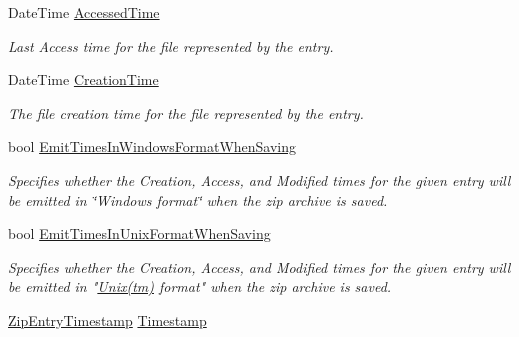 \begin{DoxyCompactItemize}
Date\+Time \mbox{\hyperlink{class_super_tiled2_unity_1_1_ionic_1_1_zip_1_1_zip_entry_abc1a038c251f1ed0e2c1435a5bab23fd}{Accessed\+Time}}
\begin{DoxyCompactList}\small\item\em Last Access time for the file represented by the entry. \end{DoxyCompactList}\item 
Date\+Time \mbox{\hyperlink{class_super_tiled2_unity_1_1_ionic_1_1_zip_1_1_zip_entry_a38ef2ae810c3b89b1f23ebea918fb60e}{Creation\+Time}}
\begin{DoxyCompactList}\small\item\em The file creation time for the file represented by the entry. \end{DoxyCompactList}\item 
bool \mbox{\hyperlink{class_super_tiled2_unity_1_1_ionic_1_1_zip_1_1_zip_entry_affabc22ba72be27e9134676becddcec7}{Emit\+Times\+In\+Windows\+Format\+When\+Saving}}
\begin{DoxyCompactList}\small\item\em Specifies whether the Creation, Access, and Modified times for the given entry will be emitted in \char`\"{}\+Windows format\char`\"{} when the zip archive is saved. \end{DoxyCompactList}\item 
bool \mbox{\hyperlink{class_super_tiled2_unity_1_1_ionic_1_1_zip_1_1_zip_entry_afd50bda347e67681780f32ebdba43f58}{Emit\+Times\+In\+Unix\+Format\+When\+Saving}}
\begin{DoxyCompactList}\small\item\em Specifies whether the Creation, Access, and Modified times for the given entry will be emitted in "\mbox{\hyperlink{namespace_super_tiled2_unity_1_1_ionic_1_1_zip_afa5034d6b4915c0633b590a28622f7fda6ec1bd1ea6a5d67a63b20c8f6172bddd}{Unix(tm)}} format" when the zip archive is saved. \end{DoxyCompactList}\item 
\mbox{\hyperlink{namespace_super_tiled2_unity_1_1_ionic_1_1_zip_afa5034d6b4915c0633b590a28622f7fd}{Zip\+Entry\+Timestamp}} \mbox{\hyperlink{class_super_tiled2_unity_1_1_ionic_1_1_zip_1_1_zip_entry_ab03dc475006c92fb01b760102d508220}{Timestamp}}

\end{DoxyCompactItemize}
